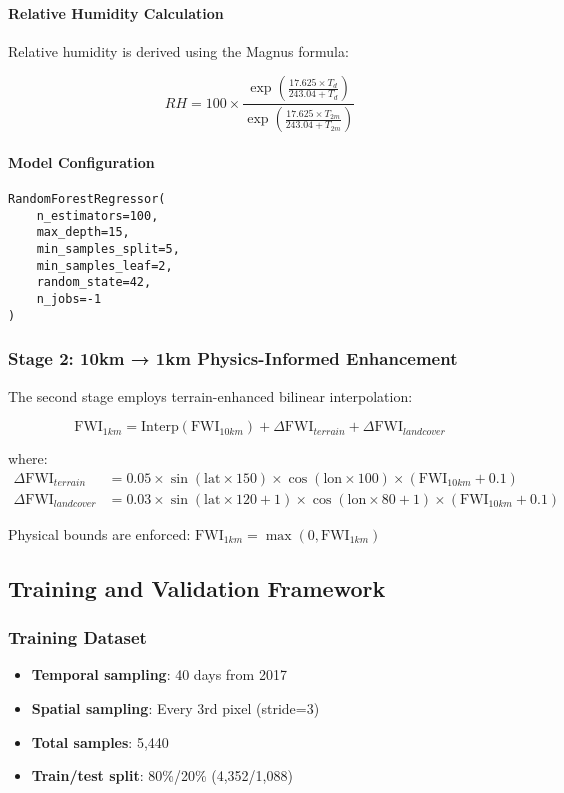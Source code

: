 \documentclass[11pt,a4paper]{article}
\begin{document}
\paragraph{Relative Humidity Calculation}
Relative humidity is derived using the Magnus formula:

\begin{equation}
    RH = 100 \times \frac{\exp\left(\frac{17.625 \times T_d}{243.04 + T_d}\right)}{\exp\left(\frac{17.625 \times T_{2m}}{243.04 + T_{2m}}\right)}
\end{equation}

\paragraph{Model Configuration}
\begin{verbatim}
RandomForestRegressor(
    n_estimators=100,
    max_depth=15,
    min_samples_split=5,
    min_samples_leaf=2,
    random_state=42,
    n_jobs=-1
)
\end{verbatim}

\subsubsection{Stage 2: 10km → 1km Physics-Informed Enhancement}

The second stage employs terrain-enhanced bilinear interpolation:

\begin{equation}
    \text{FWI}_{1km} = \text{Interp}(\text{FWI}_{10km}) + \Delta\text{FWI}_{terrain} + \Delta\text{FWI}_{landcover}
\end{equation}

where:
\begin{align}
    \Delta\text{FWI}_{terrain} &= 0.05 \times \sin(\text{lat} \times 150) \times \cos(\text{lon} \times 100) \times (\text{FWI}_{10km} + 0.1) \\
    \Delta\text{FWI}_{landcover} &= 0.03 \times \sin(\text{lat} \times 120 + 1) \times \cos(\text{lon} \times 80 + 1) \times (\text{FWI}_{10km} + 0.1)
\end{align}

Physical bounds are enforced: $\text{FWI}_{1km} = \max(0, \text{FWI}_{1km})$

\subsection{Training and Validation Framework}

\subsubsection{Training Dataset}
\begin{itemize}
    \item \textbf{Temporal sampling}: 40 days from 2017
    \item \textbf{Spatial sampling}: Every 3rd pixel (stride=3)
    \item \textbf{Total samples}: 5,440
    \item \textbf{Train/test split}: 80\%/20\% (4,352/1,088)
\end{itemize}
\end{document}
